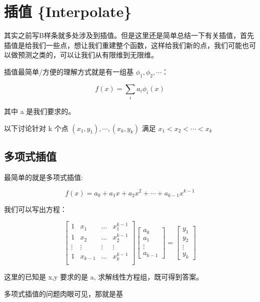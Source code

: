 \documentclass[
]{book}
\begin{document}
\hypertarget{ux63d2ux503c-interpolate}{%
\chapter{插值 \{Interpolate\}}\label{ux63d2ux503c-interpolate}}

其实之前写B样条就多处涉及到插值。但是这里还是简单总结一下有关插值，首先插值是给我们一些点，想让我们重建整个函数，这样给我们新的点，我们可能也可以做预测之类的，可以让我们从有限维到无限维。

插值最简单/方便的理解方式就是有一组基 \(\phi_1, \phi_2, \cdots\)：

\[
f(x) = \sum_i a_i \phi_i(x)
\]

其中 a 是我们要求的。

以下讨论针对 k 个点 \((x_1, y_1), \cdots, (x_k, y_k)\) 满足 \(x_1 < x_2 < \cdots < x_k\)

\hypertarget{ux591aux9879ux5f0fux63d2ux503c}{%
\section{多项式插值}\label{ux591aux9879ux5f0fux63d2ux503c}}

最简单的就是多项式插值:

\[
f(x) = a_0 + a_1x + a_2 x^2 + \cdots + a_{k-1} x^{k-1}
\]

我们可以写出方程：

\[
\begin{bmatrix}
1 & x_1  & \ldots & x_1^{k-1} \\
1 & x_2  & \ldots & x_2^{k-1} \\
\vdots & \vdots    & \vdots    &  \vdots   \\
1 & x_{k-1}  & \ldots & x_k^{k-1} \\
\end{bmatrix}
\begin{bmatrix} a_0 \\ a_1  \\ \vdots \\ a_{k-1} \end{bmatrix}  =
\begin{bmatrix} y_1 \\ y_2  \\ \vdots \\ y_k \end{bmatrix}
\]

这里的已知是 x,y 要求的是 a, 求解线性方程组，既可得到答案。

多项式插值的问题肉眼可见，那就是基
\end{document}
